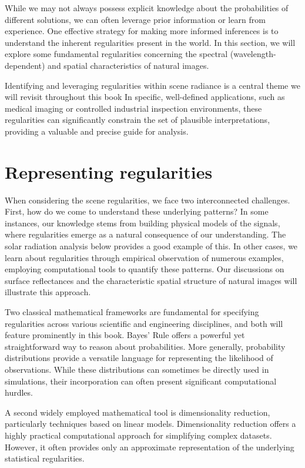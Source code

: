 \documentclass[
  letterpaper,
]{book}
\begin{document}
While we may not always possess explicit knowledge about the
probabilities of different solutions, we can often leverage prior
information or learn from experience. One effective strategy for making
more informed inferences is to understand the inherent regularities
present in the world. In this section, we will explore some fundamental
regularities concerning the spectral (wavelength-dependent) and spatial
characteristics of natural images.

Identifying and leveraging regularities within scene radiance is a
central theme we will revisit throughout this book In specific,
well-defined applications, such as medical imaging or controlled
industrial inspection environments, these regularities can significantly
constrain the set of plausible interpretations, providing a valuable and
precise guide for analysis.

\section{Representing regularities}\label{representing-regularities}

When considering the scene regularities, we face two interconnected
challenges. First, how do we come to understand these underlying
patterns? In some instances, our knowledge stems from building physical
models of the signals, where regularities emerge as a natural
consequence of our understanding. The solar radiation analysis below
provides a good example of this. In other cases, we learn about
regularities through empirical observation of numerous examples,
employing computational tools to quantify these patterns. Our
discussions on surface reflectances and the characteristic spatial
structure of natural images will illustrate this approach.

Two classical mathematical frameworks are fundamental for specifying
regularities across various scientific and engineering disciplines, and
both will feature prominently in this book. Bayes' Rule offers a
powerful yet straightforward way to reason about probabilities. More
generally, probability distributions provide a versatile language for
representing the likelihood of observations. While these distributions
can sometimes be directly used in simulations, their incorporation can
often present significant computational hurdles.

A second widely employed mathematical tool is dimensionality reduction,
particularly techniques based on linear models. Dimensionality reduction
offers a highly practical computational approach for simplifying complex
datasets. However, it often provides only an approximate representation
of the underlying statistical regularities.
\end{document}
